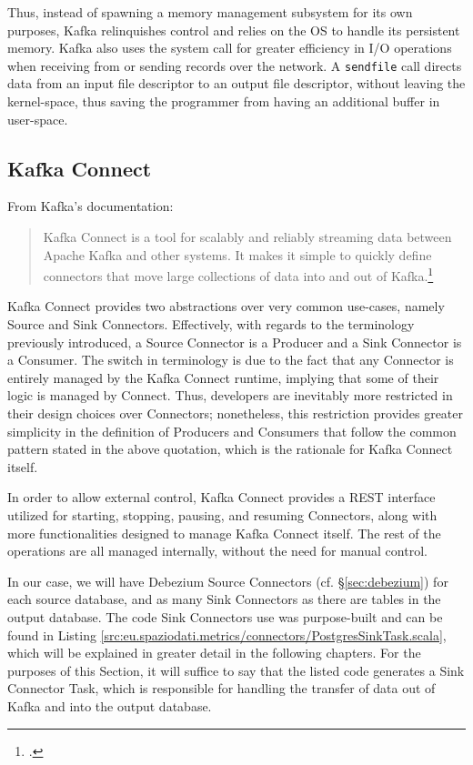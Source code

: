 Thus, instead of spawning a memory management subsystem for its own purposes, Kafka relinquishes control and relies on the OS to handle its persistent memory.
Kafka also uses the \cite[\texttt{sendfile}(2)]{linux-man} system call for greater efficiency in I/O operations when receiving from or sending records over the network.
A \texttt{sendfile} call directs data from an input file descriptor to an output file descriptor, without leaving the kernel-space, thus saving the programmer from having an additional buffer in user-space.


\subsection{Kafka Connect}
\label{sec:kafka-connect}

From Kafka's documentation:
\begin{quote}
	Kafka Connect is a tool for scalably and reliably streaming data between Apache Kafka and other systems. It makes it simple to quickly define connectors that move large collections of data into and out of Kafka.\footcite[\S 8.1]{kafka-docs}
\end{quote}

\sloppy Kafka Connect provides two abstractions over very common use-cases, namely Source and Sink Connectors.
Effectively, with regards to the terminology previously introduced, a Source Connector is a Producer and a Sink Connector is a Consumer.
The switch in terminology is due to the fact that any Connector is entirely managed by the Kafka Connect runtime, implying that some of their logic is managed by Connect.
Thus, developers are inevitably more restricted in their design choices over Connectors; nonetheless, this restriction provides greater simplicity in the definition of Producers and Consumers that follow the common pattern stated in the above quotation, which is the rationale for Kafka Connect itself.

\fussy In order to allow external control, Kafka Connect provides a REST interface utilized for starting, stopping, pausing, and resuming Connectors, along with more functionalities designed to manage Kafka Connect itself.
The rest of the operations are all managed internally, without the need for manual control.

In our case, we will have Debezium Source Connectors (cf. \S \ref{sec:debezium}) for each source database, and as many Sink Connectors as there are tables in the output database.
The code Sink Connectors use was purpose-built and can be found in Listing \ref{src:eu.spaziodati.metrics/connectors/PostgresSinkTask.scala}, which will be explained in greater detail in the following chapters.
For the purposes of this Section, it will suffice to say that the listed code generates a Sink Connector Task, which is responsible for handling the transfer of data out of Kafka and into the output database.


